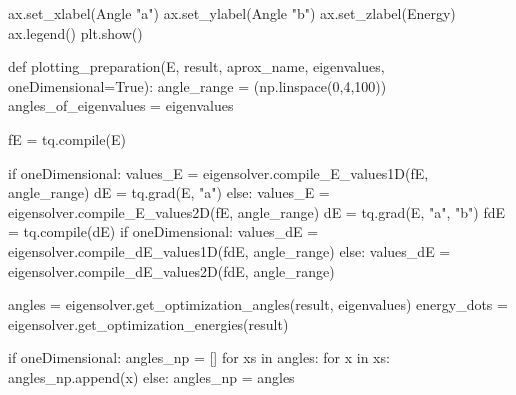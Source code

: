 \documentclass[
  letterpaper,
  DIV=11,
  numbers=noendperiod]{scrartcl}
\newenvironment{Shaded}{\begin{snugshade}}{\end{snugshade}}
\newcommand{\BuiltInTok}[1]{\textcolor[rgb]{0.00,0.23,0.31}{#1}}
\newcommand{\ControlFlowTok}[1]{\textcolor[rgb]{0.00,0.23,0.31}{#1}}
\newcommand{\DecValTok}[1]{\textcolor[rgb]{0.68,0.00,0.00}{#1}}
\newcommand{\KeywordTok}[1]{\textcolor[rgb]{0.00,0.23,0.31}{#1}}
\newcommand{\NormalTok}[1]{\textcolor[rgb]{0.00,0.23,0.31}{#1}}
\newcommand{\OperatorTok}[1]{\textcolor[rgb]{0.37,0.37,0.37}{#1}}
\newcommand{\StringTok}[1]{\textcolor[rgb]{0.13,0.47,0.30}{#1}}
\newcommand{\VariableTok}[1]{\textcolor[rgb]{0.07,0.07,0.07}{#1}}
\begin{document}
\begin{Shaded}
\begin{Highlighting}[]
\NormalTok{        ax.set\_xlabel(}\StringTok{\textquotesingle{}Angle "a"\textquotesingle{}}\NormalTok{)}
\NormalTok{        ax.set\_ylabel(}\StringTok{\textquotesingle{}Angle "b"\textquotesingle{}}\NormalTok{)}
\NormalTok{        ax.set\_zlabel(}\StringTok{\textquotesingle{}Energy\textquotesingle{}}\NormalTok{)}
\NormalTok{        ax.legend()}
\NormalTok{        plt.show()}

    \KeywordTok{def}\NormalTok{ plotting\_preparation(E, result, aprox\_name, eigenvalues, oneDimensional}\OperatorTok{=}\VariableTok{True}\NormalTok{):}
\NormalTok{        angle\_range }\OperatorTok{=}\NormalTok{ (np.linspace(}\DecValTok{0}\NormalTok{,}\DecValTok{4}\NormalTok{,}\DecValTok{100}\NormalTok{))}
\NormalTok{        angles\_of\_eigenvalues }\OperatorTok{=}\NormalTok{ eigenvalues}

\NormalTok{        fE }\OperatorTok{=}\NormalTok{ tq.}\BuiltInTok{compile}\NormalTok{(E)}
        
        \ControlFlowTok{if}\NormalTok{ oneDimensional:}
\NormalTok{            values\_E }\OperatorTok{=}\NormalTok{ eigensolver.compile\_E\_values1D(fE, angle\_range)}
\NormalTok{            dE }\OperatorTok{=}\NormalTok{ tq.grad(E, }\StringTok{"a"}\NormalTok{)}
        \ControlFlowTok{else}\NormalTok{:}
\NormalTok{            values\_E }\OperatorTok{=}\NormalTok{ eigensolver.compile\_E\_values2D(fE, angle\_range)}
\NormalTok{            dE }\OperatorTok{=}\NormalTok{ tq.grad(E, }\StringTok{"a"}\NormalTok{, }\StringTok{"b"}\NormalTok{)}
\NormalTok{        fdE }\OperatorTok{=}\NormalTok{ tq.}\BuiltInTok{compile}\NormalTok{(dE)}
        \ControlFlowTok{if}\NormalTok{ oneDimensional:}
\NormalTok{            values\_dE }\OperatorTok{=}\NormalTok{ eigensolver.compile\_dE\_values1D(fdE, angle\_range)}
        \ControlFlowTok{else}\NormalTok{:}
\NormalTok{            values\_dE }\OperatorTok{=}\NormalTok{ eigensolver.compile\_dE\_values2D(fdE, angle\_range)}
        
\NormalTok{        angles }\OperatorTok{=}\NormalTok{ eigensolver.get\_optimization\_angles(result, eigenvalues)}
\NormalTok{        energy\_dots }\OperatorTok{=}\NormalTok{ eigensolver.get\_optimization\_energies(result)}
        
        \ControlFlowTok{if}\NormalTok{ oneDimensional:}
\NormalTok{            angles\_np }\OperatorTok{=}\NormalTok{ []}
            \ControlFlowTok{for}\NormalTok{ xs }\KeywordTok{in}\NormalTok{ angles:}
                \ControlFlowTok{for}\NormalTok{ x }\KeywordTok{in}\NormalTok{ xs:}
\NormalTok{                    angles\_np.append(x)}
        \ControlFlowTok{else}\NormalTok{:}
\NormalTok{            angles\_np }\OperatorTok{=}\NormalTok{ angles}


\end{Highlighting}
\end{Shaded}
\end{document}
